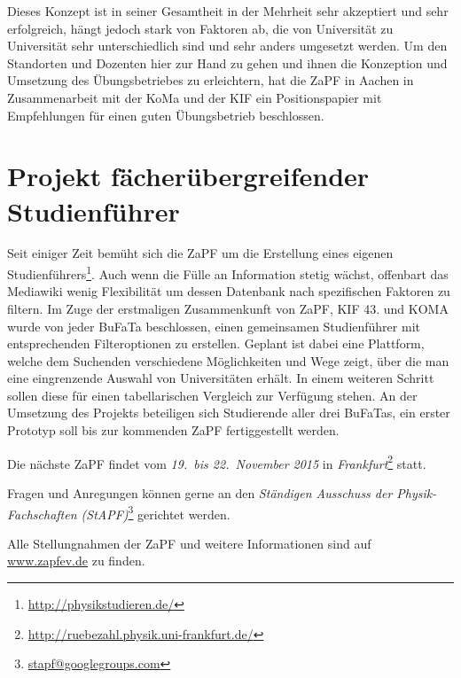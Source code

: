 \documentclass{scrartcl}
\begin{document}
Dieses Konzept ist in seiner Gesamtheit in der Mehrheit sehr akzeptiert und
sehr erfolgreich, hängt jedoch stark von Faktoren ab, die von Universität zu
Universität sehr unterschiedlich sind und sehr anders umgesetzt werden.  Um den
Standorten und Dozenten hier zur Hand zu gehen und ihnen die Konzeption und
Umsetzung des Übungsbetriebes zu erleichtern, hat die ZaPF in Aachen in
Zusammenarbeit mit der KoMa und der KIF ein Positionspapier mit Empfehlungen
für einen guten Übungsbetrieb beschlossen.

\section*{Projekt fächerübergreifender Studienführer }

Seit einiger Zeit bemüht sich die ZaPF um die Erstellung eines eigenen
Studienführers\footnote{\href{http://physikstudieren.de/}{\url{http://physikstudieren.de/}}}.
Auch wenn die Fülle an Information stetig wächst, offenbart das Mediawiki wenig
Flexibilität um dessen Datenbank nach spezifischen Faktoren zu filtern.  Im
Zuge der erstmaligen Zusammenkunft von ZaPF, KIF 43. und KOMA wurde von jeder
BuFaTa beschlossen, einen gemeinsamen Studienführer mit entsprechenden
Filteroptionen zu erstellen. Geplant ist dabei eine Plattform, welche dem
Suchenden verschiedene Möglichkeiten und Wege zeigt, über die man eine
eingrenzende Auswahl von Universitäten erhält. In einem weiteren Schritt sollen
diese für einen tabellarischen Vergleich zur Verfügung stehen.  An der
Umsetzung des Projekts beteiligen sich Studierende aller drei BuFaTas, ein
erster Prototyp soll bis zur kommenden ZaPF fertiggestellt werden.


\vspace{0.5cm}
Die nächste ZaPF findet vom \emph{19.\ bis 22.\ November 2015} in \emph{Frankfurt}\footnote{\href{http://ruebezahl.physik.uni-frankfurt.de/}{\url{http://ruebezahl.physik.uni-frankfurt.de/}}} statt.

Fragen und Anregungen können gerne an den \emph{Ständigen Ausschuss der Physik-Fachschaften (StAPF)}\footnote{\href{mailto:stapf@googlegroups.com}{\url{stapf@googlegroups.com}}} gerichtet werden.

Alle Stellungnahmen der ZaPF und weitere Informationen sind auf \href{http://www.zapfev.de}{\url{www.zapfev.de}} zu finden.
\end{document}
